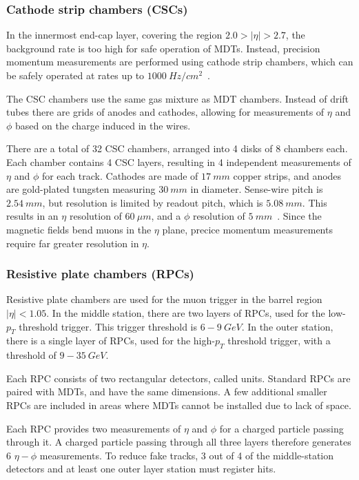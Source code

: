 \subsubsection{Cathode strip chambers (CSCs)}

In the innermost end-cap layer, covering the region $2.0 > |\eta| > 2.7$,
the background rate is too high for safe operation of MDTs.
Instead, precision momentum measurements are performed using cathode strip chambers,
which can be safely operated at rates up to $1000~Hz/cm^2$~\cite{atlas-detector-2008}.

The CSC chambers use the same gas mixture as MDT chambers.
Instead of drift tubes there are grids of anodes and cathodes, allowing for measurements of $\eta$ and $\phi$ based on
the charge induced in the wires.

There are a total of 32 CSC chambers, arranged into 4 disks of 8 chambers each.
Each chamber contains 4 CSC layers, resulting in 4 independent measurements of $\eta$ and $\phi$ for each track.
Cathodes are made of $17~mm$ copper strips, and anodes are gold-plated tungsten measuring $30~mm$ in diameter.
Sense-wire pitch is $2.54~mm$, but resolution is limited by readout pitch, which is $5.08~mm$.
This results in an $\eta$ resolution of $60~\mu m$, and a $\phi$ resolution of $5~mm$~\cite{muon-2003}.
Since the magnetic fields bend muons in the $\eta$ plane, precice momentum measurements require far greater resolution in $\eta$.

\subsubsection{Resistive plate chambers (RPCs)}

Resistive plate chambers are used for the muon trigger in the barrel region $|\eta| < 1.05$.
In the middle station, there are two layers of RPCs, used for the low-$p_T$ threshold trigger.
This trigger threshold is $6-9~GeV$.
In the outer station, there is a single layer of RPCs, used for the high-$p_T$ threshold trigger,
with a threshold of $9-35~GeV$.

Each RPC consists of two rectangular detectors, called units.
Standard RPCs are paired with MDTs, and have the same dimensions.
A few additional smaller RPCs are included in areas where MDTs cannot be installed due to lack of space.

Each RPC provides two measurements of $\eta$ and $\phi$ for a charged particle passing through it.
A charged particle passing through all three layers therefore generates 6 $\eta-\phi$ measurements.
To reduce fake tracks, 3 out of 4 of the middle-station detectors and at least one outer layer station must register hits.

